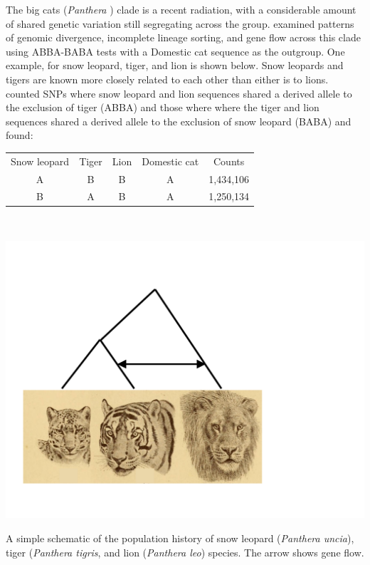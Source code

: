 The big cats ({\it Panthera }) clade is a recent radiation, with a
considerable amount of shared genetic variation still
segregating across the group. \citet{figueiro2017genome} examined
patterns of genomic divergence, incomplete lineage sorting, and gene
flow across this clade using  ABBA-BABA tests with a Domestic cat sequence as the
outgroup. One example, for snow leopard, tiger, and  lion is shown
below. Snow leopards and tigers are known more closely related to each other than
either is to lions. \citeauthor{figueiro2017genome} counted SNPs where snow leopard and lion
sequences shared a derived allele to the exclusion of tiger (ABBA)
and those where where the tiger and lion
sequences shared a derived allele to the exclusion of snow leopard
(BABA) and found:\\
\begin{tabular}{ccccc}
Snow leopard &Tiger &  Lion & Domestic cat & Counts \\
A & B & B & A &   1,434,106 \\
B & A & B & A &   1,250,134\\
\end{tabular}\\
\begin{marginfigure}
\begin{center}
\includegraphics[width=\textwidth]{illustration_images/Genetic_drift/Big_cat_ILS/Big_cat_ILS.pdf}
\end{center}
\caption{A simple schematic of the population history of snow leopard
  ({\it Panthera uncia}), tiger ({\it Panthera tigris},
  and lion ({\it Panthera leo}) species. The arrow shows gene flow.  } \label{fig:Big_cat_ILS}
\end{marginfigure}
